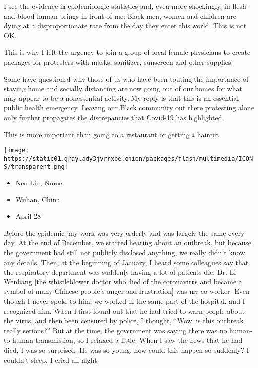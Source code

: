 I see the evidence in epidemiologic statistics and, even more
shockingly, in flesh-and-blood human beings in front of me: Black men,
women and children are dying at a disproportionate rate from the day
they enter this world. This is not OK.

This is why I felt the urgency to join a group of local female
physicians to create packages for protesters with masks, sanitizer,
sunscreen and other supplies.

Some have questioned why those of us who have been touting the
importance of staying home and socially distancing are now going out of
our homes for what may appear to be a nonessential activity. My reply is
that this is an essential public health emergency. Leaving our Black
community out there protesting alone only further propagates the
discrepancies that Covid-19 has highlighted.

This is more important than going to a restaurant or getting a haircut.

\texttt{[image: https://static01.graylady3jvrrxbe.onion/packages/flash/multimedia/ICONS/transparent.png]}

\begin{itemize}
\tightlist
\item
  Neo Liu, Nurse
\item
  Wuhan, China
\item
  April 28
\end{itemize}

Before the epidemic, my work was very orderly and was largely the same
every day. At the end of December, we started hearing about an outbreak,
but because the government had still not publicly disclosed anything, we
really didn't know any details. Then, at the beginning of January, I
heard some colleagues say that the respiratory department was suddenly
having a lot of patients die. Dr. Li Wenliang {[}the whistleblower
doctor who died of the coronavirus and became a symbol of many Chinese
people's anger and frustration{]} was my co-worker. Even though I never
spoke to him, we worked in the same part of the hospital, and I
recognized him. When I first found out that he had tried to warn people
about the virus, and then been censured by police, I thought, ``Wow, is
this outbreak really serious?'' But at the time, the government was
saying there was no human-to-human transmission, so I relaxed a little.
When I saw the news that he had died, I was so surprised. He was so
young, how could this happen so suddenly? I couldn't sleep. I cried all
night.


